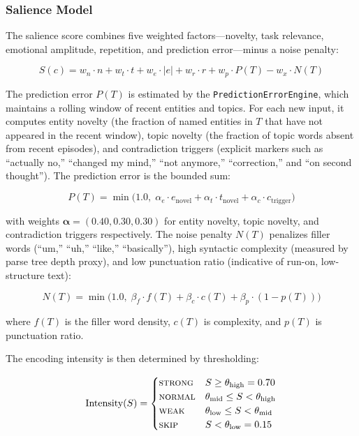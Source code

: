 \documentclass[11pt,twocolumn]{article}
\begin{document}
\subsubsection{Salience Model}

The salience score combines five weighted factors---novelty, task relevance, emotional amplitude, repetition, and prediction error---minus a noise penalty:

\begin{equation}
S(c) = w_n \cdot n + w_t \cdot t + w_e \cdot |e| + w_r \cdot r + w_p \cdot P(T) - w_x \cdot N(T)
\label{eq:salience}
\end{equation}

The prediction error $P(T)$ is estimated by the \texttt{PredictionErrorEngine}, which maintains a rolling window of recent entities and topics. For each new input, it computes entity novelty (the fraction of named entities in $T$ that have not appeared in the recent window), topic novelty (the fraction of topic words absent from recent episodes), and contradiction triggers (explicit markers such as ``actually no,'' ``changed my mind,'' ``not anymore,'' ``correction,'' and ``on second thought''). The prediction error is the bounded sum:

\begin{equation}
P(T) = \min\Big(1.0,\; \alpha_e \cdot e_{\text{novel}} + \alpha_t \cdot t_{\text{novel}} + \alpha_c \cdot c_{\text{trigger}}\Big)
\label{eq:prediction_error}
\end{equation}

with weights $\boldsymbol{\alpha} = (0.40, 0.30, 0.30)$ for entity novelty, topic novelty, and contradiction triggers respectively. The noise penalty $N(T)$ penalizes filler words (``um,'' ``uh,'' ``like,'' ``basically''), high syntactic complexity (measured by parse tree depth proxy), and low punctuation ratio (indicative of run-on, low-structure text):

\begin{equation}
N(T) = \min\Big(1.0,\; \beta_f \cdot f(T) + \beta_c \cdot c(T) + \beta_p \cdot (1 - p(T))\Big)
\label{eq:noise}
\end{equation}

where $f(T)$ is the filler word density, $c(T)$ is complexity, and $p(T)$ is punctuation ratio.

The encoding intensity is then determined by thresholding:

\begin{equation}
\text{Intensity}(S) = \begin{cases}
\text{\scshape strong} & S \geq \theta_{\text{high}} = 0.70 \\
\text{\scshape normal} & \theta_{\text{mid}} \leq S < \theta_{\text{high}} \\
\text{\scshape weak}   & \theta_{\text{low}} \leq S < \theta_{\text{mid}} \\
\text{\scshape skip}   & S < \theta_{\text{low}} = 0.15
\end{cases}
\label{eq:intensity}
\end{equation}
\end{document}
